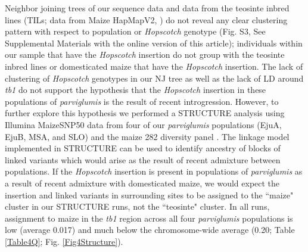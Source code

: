 \documentclass[11pt]{article} %
\begin{document}
\begin{linenumbers}
\begin{flushleft}
Neighbor joining trees of our sequence data and data from the teosinte inbred lines (TILs; data from Maize HapMapV2, \citealt{Chia2012}) do not reveal any clear clustering pattern with respect to population or \emph{Hopscotch} genotype (Fig. S3, See Supplemental Materials with the online version of this article); individuals within our sample that have the \emph{Hopscotch} insertion do not group with the teosinte inbred lines or domesticated maize that have the \emph{Hopscotch} insertion. The lack of clustering of \emph{Hopscotch} genotypes in our NJ tree as well as the lack of LD around \emph{tb1} do not support the hypothesis that the \emph{Hopscotch} insertion in these populations of \emph{parviglumis} is the result of recent introgression. However, to further explore this hypothesis we performed a STRUCTURE analysis using Illumina MaizeSNP50 data from four of our \emph{parviglumis} populations (EjuA, EjuB, MSA, and SLO) \citep{Pyhajarvi2013} and the maize 282 diversity panel \citep{Cook2012}. 
The linkage model implemented in STRUCTURE can be used to identify ancestry of blocks of linked variants which would arise as the result of recent admixture between populations. If the \emph{Hopscotch} insertion is present in populations of \emph{parviglumis} as a result of recent admixture with domesticated maize, we would expect the insertion and linked variants in surrounding sites to be assigned to the ``maize" cluster in our STRUCTURE runs, not the ``teosinte" cluster. In all runs, assignment to maize in the \emph{tb1} region across all four \emph{parviglumis} populations is low (average 0.017) and much below the chromosome-wide average (0.20; Table \ref{Table4Q}; Fig. \ref{Fig4Structure}). 


\end{flushleft}
\end{linenumbers}
\end{document}
